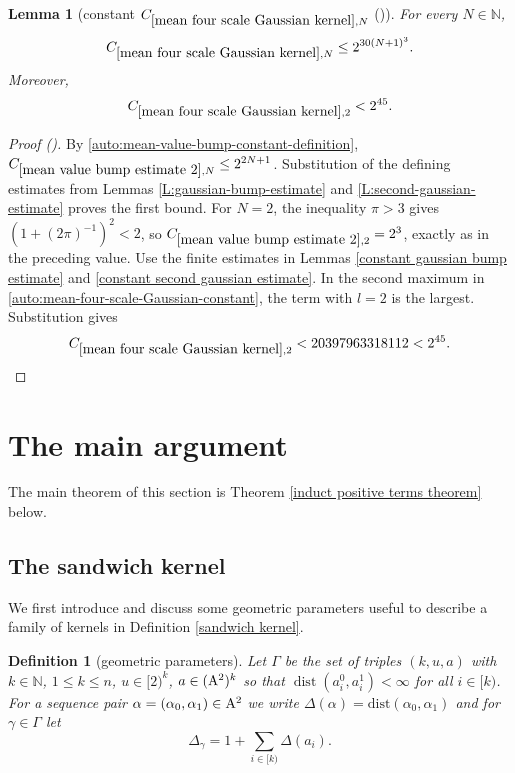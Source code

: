 \documentclass[12pt,reqno]{amsart}
\newcommand{\auto}{{({\tiny\faCar})}}
\theoremstyle{plain}
\newtheorem{lemma}[theorem]{Lemma}
\newtheorem{definition}[theorem]{Definition}
\numberwithin{equation}{section}
\theoremstyle{remark}
\newcommand{\uses}[1]{}
\newcommand{\usesdefs}[1]{}
\newcommand{\N}{{\mathbb N}}
\DeclareMathOperator{\dist}{dist}
\begin{document}
\begin{lemma}[constant $C_{\ref{mean four scale Gaussian kernel},N}$ \auto]\label{constant mean four scale Gaussian kernel}\uses{mean value bump estimate 2,L:gaussian-bump-estimate,L:second-gaussian-estimate,constant gaussian bump estimate,constant second gaussian estimate,mean four scale Gaussian kernel}\usesdefs{}
For every $N\in\N$,
\begin{equation}\label{constant mean four scale Gaussian kernel bound}
C_{\ref{mean four scale Gaussian kernel},N}\le2^{30(N+1)^3}.
\end{equation}
Moreover,
\begin{equation}\label{auto:constant-mean-four-scale-Gaussian-kernel-two}
C_{\ref{mean four scale Gaussian kernel},2}<2^{45}.
\end{equation}
\end{lemma}
\begin{proof}[Proof \auto]
By \eqref{auto:mean-value-bump-constant-definition}, $C_{\ref{mean value bump estimate 2},N}\le2^{2N+1}$. Substitution of the defining estimates from Lemmas \ref{L:gaussian-bump-estimate} and \ref{L:second-gaussian-estimate} proves the first bound. For $N=2$, the inequality $\pi>3$ gives $(1+(2\pi)^{-1})^2<2$, so $C_{\ref{mean value bump estimate 2},2}=2^3$, exactly as in the preceding value. Use the finite estimates in Lemmas \ref{constant gaussian bump estimate} and \ref{constant second gaussian estimate}. In the second maximum in \eqref{auto:mean-four-scale-Gaussian-constant}, the term with $l=2$ is the largest. Substitution gives
\[
C_{\ref{mean four scale Gaussian kernel},2}<20397963318112<2^{45}.
\]
\end{proof}


\section{The main argument}\label{sec:main argument}

The main theorem of this section is Theorem \ref{induct positive terms theorem} below.

\subsection{The sandwich kernel}

We first introduce  and discuss some geometric parameters useful to describe a family of kernels in Definition \ref{sandwich kernel}.

\begin{definition}[geometric parameters]\label{geometric parameters}\uses{}\usesdefs{multiplicatively spaced monotone sequences,Distance of spaced sequences}
  Let $\Gamma$ be the set of triples $(k,u,a)$ with $k\in\N$, $1\le k\le n$, $u\in[2)^k$, $a\in ({\rm A}^{2})^k$  so that $\dist(a_{i}^0,a_{i}^1)<\infty$ for all $i\in [k)$.
  For a sequence pair $\alpha=(\alpha_0,\alpha_1)\in {\rm A}^2$ we write $\Delta(\alpha) = \mathrm{dist}(\alpha_{0}, \alpha_1)$
  and for $\gamma\in\Gamma$ let
  \begin{equation}\label{auto:sandwich-distance-sum} \Delta_\gamma= 1+\sum_{i\in [k)} \Delta(a_i). \end{equation}
\end{definition}
\end{document}
